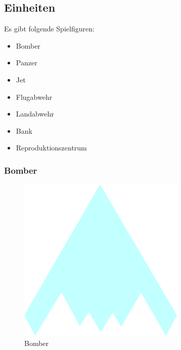 \documentclass[ngerman, 12pt, pdftex]{scrartcl}[2006/07/30]
\begin{document}
%

\newpage

\subsection{Einheiten} \label{subsec:Einheit}

Es gibt folgende Spielfiguren: 
\begin{itemize}
\item Bomber
\item Panzer
\item Jet
\item Flugabwehr
\item Landabwehr
\item Bank
\item  Reproduktionszentrum
\end{itemize}

\subsubsection{Bomber}

\begin{figure}[h]
\centering
\includegraphics[scale=1.8]{spiel/Bomber.png}
\caption{Bomber}
\end{figure}
\end{document}
